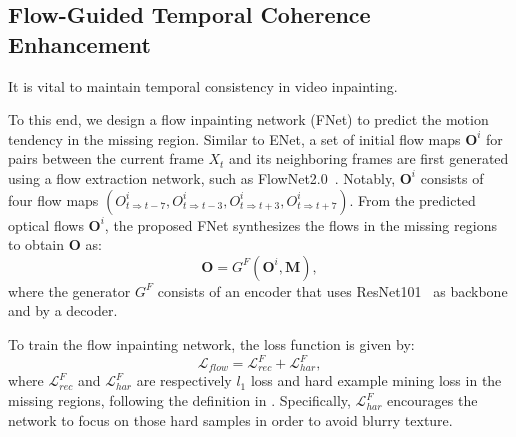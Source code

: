 \subsection{Flow-Guided Temporal Coherence Enhancement}

It is vital to maintain temporal consistency in video inpainting.
%


To this end, we design a flow inpainting network (FNet) to predict the motion tendency in the missing region.
%
Similar to ENet, a set of initial flow maps \(\boldsymbol{O}^i\) for pairs between the current frame $X_t$ and its neighboring frames are first generated using a flow extraction network, such as FlowNet2.0~\cite{Flownet_2017_CVPR}.
Notably, \(\boldsymbol{O}^i\) consists of four flow maps \((O^i_{t\Rightarrow t-7}, O^i_{t\Rightarrow t-3}, O^i_{t\Rightarrow t+3}, O^i_{t\Rightarrow t+7})\).
From the predicted optical flows $\boldsymbol{O}^i$, the proposed FNet synthesizes the flows in the missing regions to obtain \(\boldsymbol{O}\) as:
\begin{equation}
	\label{eq:flownet}
	\boldsymbol{O}=G^F(\boldsymbol{O}^{i},\boldsymbol{M}),
\end{equation}
where the generator $G^F$ consists of an encoder that uses ResNet101~ as backbone and by a decoder.

To train the flow inpainting network, the loss function is given by:
\begin{equation}
	\label{eq:flow_all}
	\mathcal{L}_{flow}=\mathcal{L}^F_{rec}+ \mathcal{L}^F_{har},
\end{equation}
where $\mathcal{L}^F_{rec}$ and $\mathcal{L}^F_{har}$ are respectively $l_1$ loss and hard example mining loss in the missing regions, following the definition in \cite{Xu_2019_CVPR}. 
Specifically, $\mathcal{L}^F_{har}$ encourages the network to focus on those hard samples in order to avoid blurry texture.


